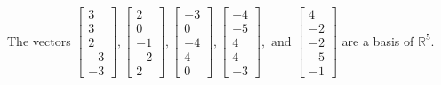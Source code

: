 \begin{exercise}
\begin{exerciseStatement}
  \end{exerciseStatement}
  \begin{exerciseAnswer}
   The vectors \(\left[\begin{array}{r}
3 \\
3 \\
2 \\
-3 \\
-3
\end{array}\right] , \left[\begin{array}{r}
2 \\
0 \\
-1 \\
-2 \\
2
\end{array}\right] , \left[\begin{array}{r}
-3 \\
0 \\
-4 \\
4 \\
0
\end{array}\right] , \left[\begin{array}{r}
-4 \\
-5 \\
4 \\
4 \\
-3
\end{array}\right] , \text{ and } \left[\begin{array}{r}
4 \\
-2 \\
-2 \\
-5 \\
-1
\end{array}\right]\) 
  	 are  a basis of \(\mathbb{R}^5\).
  


  \end{exerciseAnswer}
\end{exercise}